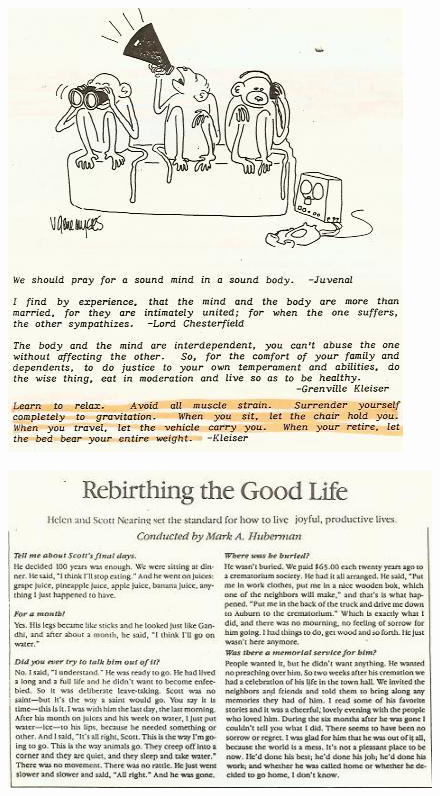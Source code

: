 \documentclass[12pt,letterpaper]{article}
\begin{document}
\begin{figure} 
  \centering
  \includegraphics[width=\textwidth]{p36.jpg}
\end{figure}




\begin{figure}
  \centering

  \includegraphics[width=1.2\textwidth]{scott-nearing.jpg}
\end{figure}
\end{document}
